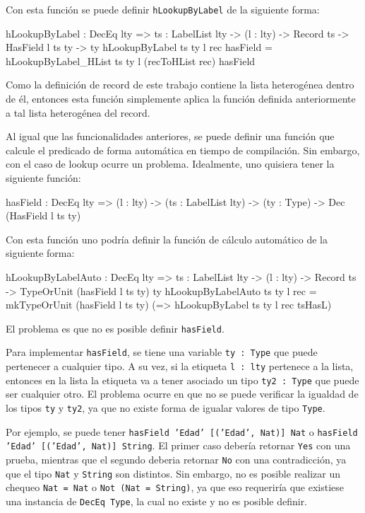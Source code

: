 Con esta función se puede definir \texttt{hLookupByLabel} de la siguiente forma:

\begin{code}
hLookupByLabel : DecEq lty => {ts : LabelList lty} ->
  (l : lty) -> Record ts -> HasField l ts ty -> ty
hLookupByLabel {ts} {ty} l rec hasField =
  hLookupByLabel_HList {ts} {ty} l (recToHList rec) hasField
\end{code}

Como la definición de record de este trabajo contiene la lista heterogénea dentro de él, entonces esta función simplemente aplica la función definida anteriormente a tal lista heterogénea del record.

Al igual que las funcionalidades anteriores, se puede definir una función que calcule el predicado de forma automática en tiempo de compilación. Sin embargo, con el caso de lookup ocurre un problema. Idealmente, uno quisiera tener la siguiente función:

\begin{code}
hasField : DecEq lty => (l : lty) ->
  (ts : LabelList lty) -> (ty : Type) ->
  Dec (HasField l ts ty)
\end{code}

Con esta función uno podría definir la función de cálculo automático de la siguiente forma:

\begin{code}
hLookupByLabelAuto : DecEq lty => {ts : LabelList lty} ->
  (l : lty) -> Record ts ->
  TypeOrUnit (hasField l ts ty) ty
hLookupByLabelAuto {ts} {ty} l rec =
  mkTypeOrUnit (hasField l ts ty)
  (\tsHasL => hLookupByLabel {ts} {ty} l rec tsHasL)
\end{code}

El problema es que no es posible definir \texttt{hasField}.

Para implementar \texttt{hasField}, se tiene una variable \texttt{ty : Type} que puede pertenecer a cualquier tipo. A su vez, si la etiqueta \texttt{l : lty} pertenece a la lista, entonces en la lista la etiqueta va a tener asociado un tipo \texttt{ty2 : Type} que puede ser cualquier otro. El problema ocurre en que no se puede verificar la igualdad de los tipos \texttt{ty} y \texttt{ty2}, ya que no existe forma de igualar valores de tipo \texttt{Type}.

Por ejemplo, se puede tener \texttt{hasField 'Edad' [('Edad', Nat)] Nat} o \texttt{hasField 'Edad' [('Edad', Nat)] String}. El primer caso debería retornar \texttt{Yes} con una prueba, mientras que el segundo deberia retornar \texttt{No} con una contradicción, ya que el tipo \texttt{Nat} y \texttt{String} son distintos. Sin embargo, no es posible realizar un chequeo \texttt{Nat = Nat} o \texttt{Not (Nat = String)}, ya que eso requeriría que existiese una instancia de \texttt{DecEq Type}, la cual no existe y no es posible definir.

